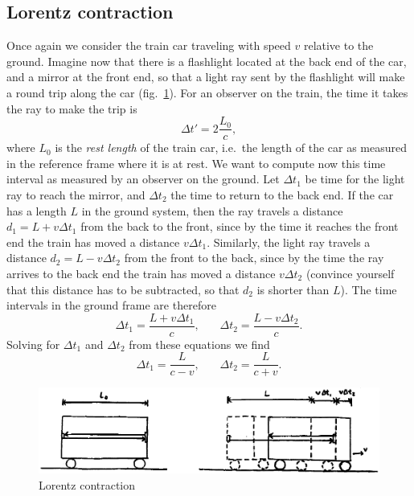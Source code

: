 \subsection{Lorentz contraction}

Once again we consider the train car traveling with speed $v$ relative to the ground. Imagine now that there is a flashlight located at the back end of the car, and a mirror at the front end, so that a light ray sent by the flashlight will make a round trip along the car (fig.\ \ref{fig:lec2_3}). For an observer on the train, the time it takes the ray to make the trip is
\begin{equation}
\Delta t'=2\frac{L_0}{c},
\end{equation}
where $L_0$ is the {\it rest length} of the train car, i.e.\ the length of the car as measured in the reference frame where it is at rest. We want to compute now this time interval as measured by an observer on the ground. Let $\Delta t_1$ be time for the light ray to reach the mirror, and $\Delta t_2$ the time to return to the back end. If the car has a length $L$ in the ground system, then the ray travels a distance $d_1=L+v\Delta t_1$ from the back to the front, since by the time it reaches the front end the train has moved a distance $v\Delta t_1$. Similarly, the light ray travels a distance $d_2=L-v\Delta t_2$ from the front to the back, since by the time the ray arrives to the back end the train has moved a distance $v\Delta t_2$ (convince yourself that this distance has to be subtracted, so that $d_2$ is shorter than $L$). The time intervals in the ground frame are therefore
\begin{equation}
\Delta t_1=\frac{L+v\Delta t_1}{c},~~~~~~~~\Delta t_2=\frac{L-v\Delta t_2}{c}.
\end{equation}
Solving for $\Delta t_1$ and $\Delta t_2$ from these equations we find
\begin{equation}
\Delta t_1=\frac{L}{c-v},~~~~~~~~\Delta t_2=\frac{L}{c+v}.
\end{equation}
\begin{figure}[ht]
\begin{center}
\includegraphics[scale=0.6]{Draw/lec2_3.png}
\end{center}
\caption{Lorentz contraction}
\label{fig:lec2_3}
\end{figure}

